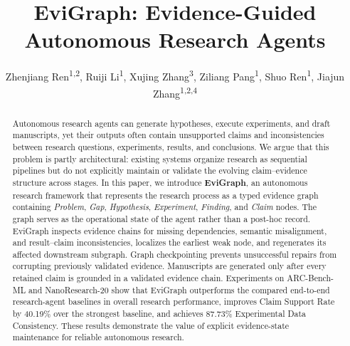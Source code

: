 \documentclass[letterpaper]{article} %
\title{EviGraph: Evidence-Guided Autonomous Research Agents}
\author{
    Zhenjiang Ren\textsuperscript{\rm 1,\rm 2},
    Ruiji Li\textsuperscript{\rm 1},
    Xujing Zhang\textsuperscript{\rm 3},
    Ziliang Pang\textsuperscript{\rm 1},
    Shuo Ren\textsuperscript{\rm 1}\corresponding,
    Jiajun Zhang\textsuperscript{\rm 1,\rm 2,\rm 4}\corresponding
}
\begin{document}
\maketitle

\begin{abstract}
Autonomous research agents can generate hypotheses, execute experiments, and draft manuscripts, yet their outputs often contain unsupported claims and inconsistencies between research questions, experiments, results, and conclusions. We argue that this problem is partly architectural: existing systems organize research as sequential pipelines but do not explicitly maintain or validate the evolving claim–evidence structure across stages.
In this paper, we introduce \textbf{EviGraph}, an autonomous research framework that represents the research process as a typed evidence graph containing \textit{Problem}, \textit{Gap}, \textit{Hypothesis}, \textit{Experiment}, \textit{Finding}, and \textit{Claim} nodes. The graph serves as the operational state of the agent rather than a post-hoc record. EviGraph inspects evidence chains for missing dependencies, semantic misalignment, and result–claim inconsistencies, localizes the earliest weak node, and regenerates its affected downstream subgraph. Graph checkpointing prevents unsuccessful repairs from corrupting previously validated evidence. Manuscripts are generated only after every retained claim is grounded in a validated evidence chain.
Experiments on ARC-Bench-ML and NanoResearch-20 show that EviGraph outperforms the compared end-to-end research-agent baselines in overall research performance, improves Claim Support Rate by 40.19\% over the strongest baseline, and achieves 87.73\% Experimental Data Consistency. These results demonstrate the value of explicit evidence-state maintenance for reliable autonomous research.


\end{abstract}

\end{document}
